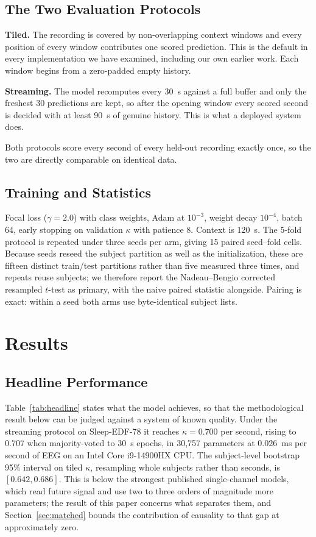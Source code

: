 \documentclass[conference]{IEEEtran}
\begin{document}
\subsection{The Two Evaluation Protocols}

\textbf{Tiled.} The recording is covered by non-overlapping context windows and every position of
every window contributes one scored prediction. This is the default in every implementation we have
examined, including our own earlier work. Each window begins from a zero-padded empty history.

\textbf{Streaming.} The model recomputes every 30~s against a full buffer and only the freshest 30
predictions are kept, so after the opening window every scored second is decided with at least
90~s of genuine history. This is what a deployed system does.

Both protocols score every second of every held-out recording exactly once, so the two are directly
comparable on identical data.

\subsection{Training and Statistics}

Focal loss ($\gamma = 2.0$) with class weights, Adam at $10^{-3}$, weight decay $10^{-4}$, batch 64,
early stopping on validation $\kappa$ with patience 8. Context is 120~s. The 5-fold protocol is
repeated under three seeds per arm, giving 15 paired seed--fold cells. Because seeds reseed the
subject partition as well as the initialization, these are fifteen distinct train/test partitions
rather than five measured three times, and repeats reuse subjects; we therefore report the
Nadeau--Bengio corrected resampled $t$-test as primary, with the naive paired statistic alongside.
Pairing is exact: within a seed both arms use byte-identical subject lists.

\section{Results}

\subsection{Headline Performance}

Table~\ref{tab:headline} states what the model achieves, so that the methodological result below
can be judged against a system of known quality. Under the streaming protocol on Sleep-EDF-78 it
reaches $\kappa = 0.700$ per second, rising to $0.707$ when majority-voted to 30~s epochs, in
30{,}757 parameters at $0.026$~ms per second of EEG on an Intel Core i9-14900HX CPU. The
subject-level bootstrap 95\% interval on tiled $\kappa$, resampling whole subjects rather than
seconds, is $[0.642, 0.686]$. This is below the strongest published single-channel models, which
read future signal and use two to three orders of magnitude more parameters; the result of this
paper concerns what separates them, and Section~\ref{sec:matched} bounds the contribution of
causality to that gap at approximately zero.
\end{document}
